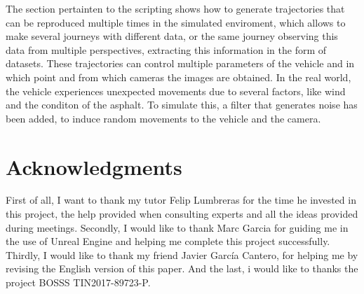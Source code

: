 \documentclass[10pt,a4paper,twocolumn,twoside]{article}
\begin{document}
The section pertainten to the scripting shows how to generate trajectories that can be reproduced multiple times in the simulated enviroment, which allows to make several journeys with different data, or the same journey observing this data from multiple perspectives, extracting this information in the form of datasets. These trajectories can control multiple parameters of the vehicle and in which point and from which cameras the images are obtained. In the real world, the vehicle experiences unexpected movements due to several factors, like wind and the conditon of the asphalt. To simulate this, a filter that generates noise has been added, to induce random movements to the vehicle and the camera.

\section*{Acknowledgments}

First of all, I want to thank  my tutor Felip Lumbreras for the time he invested in this project, the help provided when consulting experts and all the ideas provided during meetings. Secondly, I would like to thank Marc Garcia for guiding me in the use of Unreal Engine and helping me complete this project successfully. Thirdly, I would like to thank my friend Javier García Cantero, for helping me by revising the English version of this paper. And the last, i would like to thanks the project BOSSS TIN2017-89723-P.
\end{document}
